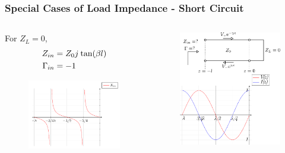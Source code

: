\documentclass[10pt, compress]{beamer}
\renewcommand{\j}{{j}\mkern1mu} %
\begin{document}
\begin{frame}
  \frametitle{Special Cases of Load Impedance - Short Circuit}
  \begin{columns}[T] %
    \begin{column}{.4\textwidth}
      For $Z_L = 0$,
      \begin{align*}
        Z_{in} &= Z_0 \j \tan (\beta l) \\
        \Gamma_{in} &= -1 
      \end{align*}
      \begin{figure}[h!]
        \centering
        \includegraphics[width=.95\textwidth]{short_impedance.pdf}
      \end{figure}
     \end{column}
   \begin{column}[T]{.6\textwidth}
    \begin{figure}[T!]
      \centering
      \includegraphics[width=.9\textwidth]{tline_short.pdf}
      \end{figure}
        \end{column}%
  \end{columns}
\end{frame}
\end{document}
